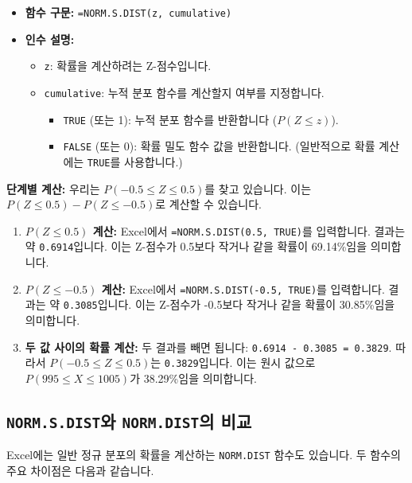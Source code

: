 \documentclass[11pt,a4paper]{article}
\theoremstyle{definition}
\begin{document}
\begin{itemize}
    \item \textbf{함수 구문:} \texttt{=NORM.S.DIST(z, cumulative)}
    \item \textbf{인수 설명:}
    \begin{itemize}
        \item \texttt{z}: 확률을 계산하려는 Z-점수입니다.
        \item \texttt{cumulative}: 누적 분포 함수를 계산할지 여부를 지정합니다.
        \begin{itemize}
            \item \texttt{TRUE} (또는 1): 누적 분포 함수를 반환합니다 ($P(Z \le z)$).
            \item \texttt{FALSE} (또는 0): 확률 밀도 함수 값을 반환합니다. (일반적으로 확률 계산에는 \texttt{TRUE}를 사용합니다.)
        \end{itemize}
    \end{itemize}
\end{itemize}

\begin{examplebox}
    \textbf{단계별 계산:}
    우리는 $P(-0.5 \le Z \le 0.5)$를 찾고 있습니다. 이는 $P(Z \le 0.5) - P(Z \le -0.5)$로 계산할 수 있습니다.

    \begin{enumerate}
        \item \textbf{$P(Z \le 0.5)$ 계산:}
        Excel에서 \texttt{=NORM.S.DIST(0.5, TRUE)}를 입력합니다.
        결과는 약 \texttt{0.6914}입니다.
        이는 Z-점수가 0.5보다 작거나 같을 확률이 69.14\%임을 의미합니다.

        \item \textbf{$P(Z \le -0.5)$ 계산:}
        Excel에서 \texttt{=NORM.S.DIST(-0.5, TRUE)}를 입력합니다.
        결과는 약 \texttt{0.3085}입니다.
        이는 Z-점수가 -0.5보다 작거나 같을 확률이 30.85\%임을 의미합니다.

        \item \textbf{두 값 사이의 확률 계산:}
        두 결과를 빼면 됩니다: \texttt{0.6914 - 0.3085 = 0.3829}.
        따라서 $P(-0.5 \le Z \le 0.5)$는 \texttt{0.3829}입니다.
        이는 원시 값으로 $P(995 \le X \le 1005)$가 38.29\%임을 의미합니다.
    \end{enumerate}
\end{examplebox}

\subsection{\texttt{NORM.S.DIST}와 \texttt{NORM.DIST}의 비교}
Excel에는 일반 정규 분포의 확률을 계산하는 \texttt{NORM.DIST} 함수도 있습니다.
두 함수의 주요 차이점은 다음과 같습니다.
\end{document}
